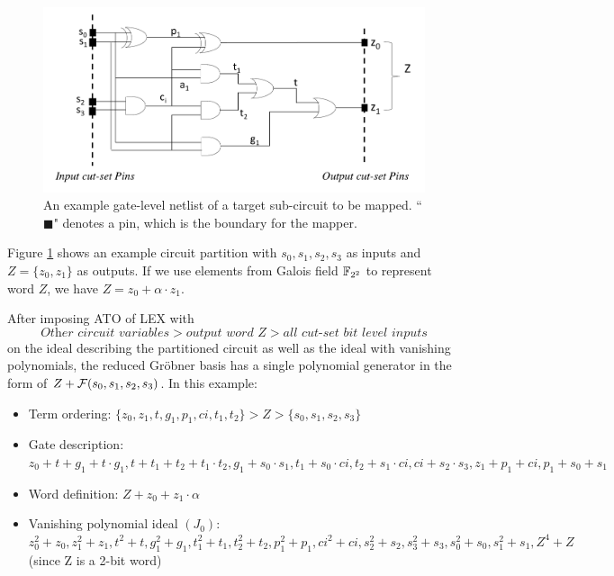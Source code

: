 \begin{figure}[tbp]
	\begin{center}
	\includegraphics[width=\textwidth]{newfig/tobemapped.pdf}
	\end{center}
	\caption{An example gate-level netlist of a target sub-circuit to be mapped. ``$\blacksquare$" denotes a pin, 
	which is the boundary for the mapper.}
	\label{fig:tobemapped}
\end{figure}

Figure \ref{fig:tobemapped} shows an example circuit partition with $s_0,s_1,s_2,s_3$ as inputs and
$Z = \{z_0,z_1\}$ as outputs. If we use elements from Galois field ${\mathbb{F}}_{2^2}$ to represent word $Z$,
we have $Z = z_0 + \alpha\cdot z_1$.

After imposing ATO of LEX with
$$\textit{Other\ circuit\ variables} > \textit{output\ word\ } Z > \textit{all\ cut-set\ bit\ level\ inputs}$$
on the ideal describing the partitioned circuit as well as the ideal with vanishing polynomials,
the reduced Gr\"obner basis has a single polynomial generator in the form of $Z + {\mathcal{F}}(s_0,s_1,s_2,s_3)$.
In this example:

\begin{itemize}
\item Term ordering: $\{z_0,z_1,t,g_1,p_1,ci,t_1,t_2\}>Z>\{s_0,s_1,s_2,s_3\}$
\item Gate description: $z_0+t+g_1+t\cdot g_1, t+t_1+t_2+t_1\cdot t_2, g_1+s_0\cdot s_1,
			t_1+s_0\cdot ci, t_2+s_1\cdot ci, ci+s_2\cdot s_3, z_1+p_1+ci, p_1+s_0+s_1$
\item Word definition: $Z+z_0+z_1\cdot \alpha$
\item Vanishing polynomial ideal $(J_0)$: $z_0^2+z_0, z_1^2+z_1, t^2+t, g_1^2+g_1, t_1^2+t_1, t_2^2+t_2, p_1^2+p_1, ci^2+ci,
			s_2^2+s_2, s_3^2+s_3, s_0^2+s_0, s_1^2+s_1, Z^4+Z$ (since Z is a 2-bit word)
\end{itemize}

